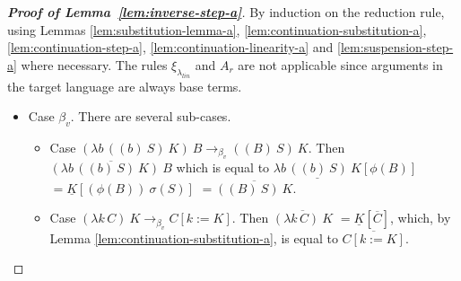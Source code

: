 \documentclass{LMCS}
\newcommand{\xto}[1]{\ensuremath{\rightarrow_{#1}}}
\newcommand{\tobv}{\xto{\beta_v}}
\begin{document}
\begin{proof}[\bf Proof of Lemma~\ref{lem:inverse-step-a}]
  By induction on the reduction rule, using Lemmas \ref{lem:substitution-lemma-a},
  \ref{lem:continuation-substitution-a}, \ref{lem:continuation-step-a},
  \ref{lem:continuation-linearity-a} and \ref{lem:suspension-step-a}
  where necessary. The rules $\xi_{\lambda_{lin}}$ and
  $A_{r}$ are not applicable since arguments in the target language
  are always base terms.
  \begin{itemize}
    \item Case $\beta_{v}$. There are several sub-cases.
      \begin{itemize}
	\item Case $(\lambda b\,((b)~S)~K)~B\tobv ((B)~S)~K$. Then 
	  $\overline{(\lambda b\,((b)~S)~K)~B}$
	  which is equal to
	  $\underline{\lambda b\,((b)~S)~K}[\phi(B)]$
	  $=\underline{K}[(\phi(B))~\sigma(S)]$
	  $=\overline{((B)~S)~K}$.

	\item Case $(\lambda k\,C)~K\tobv C[k:=K]$. Then
	  $\overline{(\lambda k\,C)~K}$
	  $=\underline{K}[\overline{C}]$,
	  which, by Lemma \ref{lem:continuation-substitution-a}, is equal to
	  $\overline{C[k:=K]}$.


\end{itemize}
\end{itemize}
\end{proof}
\end{document}
